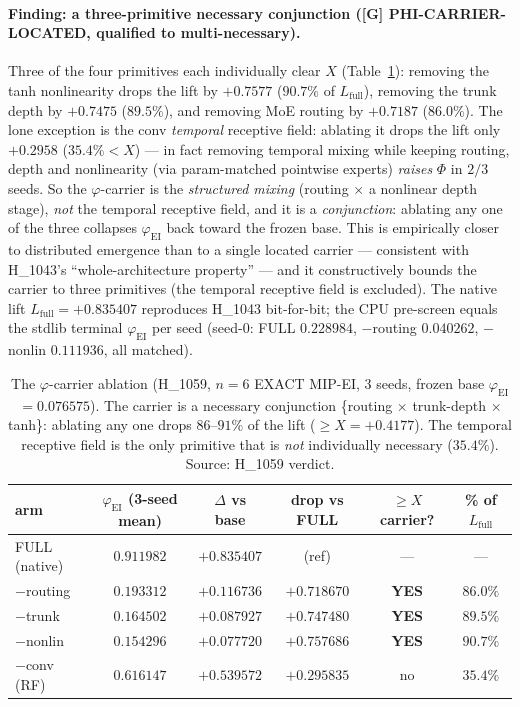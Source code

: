 \documentclass[11pt,a4paper]{article}
\providecommand{\tierGreen}{\textcolor{green!50!black}{\textbf{[G]}}}
\newcommand{\faithful}{\ensuremath{\varphi_{\mathrm{EI}}}}
\begin{document}
\paragraph{Finding: a three-primitive necessary conjunction
(\tierGreen{} PHI-CARRIER-LOCATED, qualified to multi-necessary).} Three of the
four primitives each individually clear $X$ (Table~\ref{tab:carrier}): removing
the tanh nonlinearity drops the lift by $+0.7577$ ($90.7\%$ of $L_{\mathrm{full}}$),
removing the trunk depth by $+0.7475$ ($89.5\%$), and removing MoE routing by
$+0.7187$ ($86.0\%$). The lone exception is the conv \emph{temporal} receptive
field: ablating it drops the lift only $+0.2958$ ($35.4\%<X$) --- in fact
removing temporal mixing while keeping routing, depth and nonlinearity (via
param-matched pointwise experts) \emph{raises} $\Phi$ in $2/3$ seeds. So the
$\varphi$-carrier is the \emph{structured mixing} (routing $\times$ a nonlinear
depth stage), \emph{not} the temporal receptive field, and it is a
\emph{conjunction}: ablating any one of the three collapses \faithful{} back
toward the frozen base. This is empirically closer to distributed emergence than
to a single located carrier --- consistent with H\_1043's
``whole-architecture property'' --- and it constructively bounds the carrier to
three primitives (the temporal receptive field is excluded). The native lift
$L_{\mathrm{full}}=+0.835407$ reproduces H\_1043 bit-for-bit; the CPU
pre-screen equals the stdlib terminal \faithful{} per seed
(seed-0: FULL $0.228984$, $-$routing $0.040262$, $-$nonlin $0.111936$, all
matched).

\begin{table}[h]
\centering
\small
\begin{tabular}{lccccc}
\toprule
\textbf{arm} & \textbf{\faithful{} (3-seed mean)} & \textbf{$\Delta$ vs base} & \textbf{drop vs FULL} & \textbf{$\ge X$ carrier?} & \textbf{\% of $L_{\mathrm{full}}$} \\
\midrule
FULL (native) & $0.911982$ & $+0.835407$ & (ref) & --- & --- \\
$-$routing    & $0.193312$ & $+0.116736$ & $+0.718670$ & \textbf{YES} & $86.0\%$ \\
$-$trunk      & $0.164502$ & $+0.087927$ & $+0.747480$ & \textbf{YES} & $89.5\%$ \\
$-$nonlin     & $0.154296$ & $+0.077720$ & $+0.757686$ & \textbf{YES} & $90.7\%$ \\
$-$conv (RF)  & $0.616147$ & $+0.539572$ & $+0.295835$ & no           & $35.4\%$ \\
\bottomrule
\end{tabular}
\caption{The $\varphi$-carrier ablation (H\_1059, $n=6$ EXACT MIP-EI, 3 seeds,
frozen base \faithful${}=0.076575$). The carrier is a necessary conjunction
\{routing $\times$ trunk-depth $\times$ tanh\}: ablating any one drops
$86$--$91\%$ of the lift ($\ge X=+0.4177$). The temporal receptive field is the
only primitive that is \emph{not} individually necessary ($35.4\%$). Source:
H\_1059 verdict.}
\label{tab:carrier}
\end{table}
\end{document}

